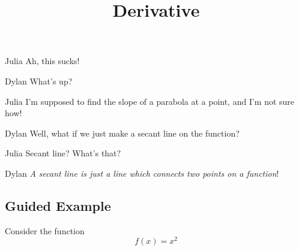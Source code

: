 \documentclass{ximera}
\title{Derivative}
\begin{document}
\maketitle
\begin{dialogue}
\item[Julia] Ah, this sucks!
\item[Dylan] What's up?
\item[Julia] I'm supposed to find the slope of a parabola at a point, and I'm not sure how!
\item[Dylan] Well, what if we just make a secant line on the function?
\item[Julia] Secant line? What's that?
\item[Dylan] \textit{A secant line is just a line which connects two points on a function}!
\end{dialogue}

\subsection{Guided Example}

Consider the function $$f(x) = x^2$$
\end{document}
